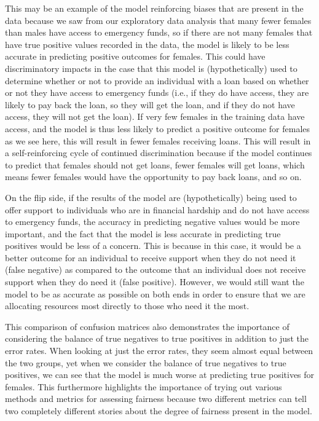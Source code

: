 \documentclass[water,article,submit,moreauthors,pdftex]{mdpi}
\begin{document}
This may be an example of the model reinforcing biases that are present
in the data because we saw from our exploratory data analysis that many
fewer females than males have access to emergency funds, so if there are
not many females that have true positive values recorded in the data,
the model is likely to be less accurate in predicting positive outcomes
for females. This could have discriminatory impacts in the case that
this model is (hypothetically) used to determine whether or not to
provide an individual with a loan based on whether or not they have
access to emergency funds (i.e., if they do have access, they are likely
to pay back the loan, so they will get the loan, and if they do not have
access, they will not get the loan). If very few females in the training
data have access, and the model is thus less likely to predict a
positive outcome for females as we see here, this will result in fewer
females receiving loans. This will result in a self-reinforcing cycle of
continued discrimination because if the model continues to predict that
females should not get loans, fewer females will get loans, which means
fewer females would have the opportunity to pay back loans, and so on.

On the flip side, if the results of the model are (hypothetically) being
used to offer support to individuals who are in financial hardship and
do not have access to emergency funds, the accuracy in predicting
negative values would be more important, and the fact that the model is
less accurate in predicting true positives would be less of a concern.
This is because in this case, it would be a better outcome for an
individual to receive support when they do not need it (false negative)
as compared to the outcome that an individual does not receive support
when they do need it (false positive). However, we would still want the
model to be as accurate as possible on both ends in order to ensure that
we are allocating resources most directly to those who need it the most.

This comparison of confusion matrices also demonstrates the importance
of considering the balance of true negatives to true positives in
addition to just the error rates. When looking at just the error rates,
they seem almost equal between the two groups, yet when we consider the
balance of true negatives to true positives, we can see that the model
is much worse at predicting true positives for females. This furthermore
highlights the importance of trying out various methods and metrics for
assessing fairness because two different metrics can tell two completely
different stories about the degree of fairness present in the model.
\end{document}
